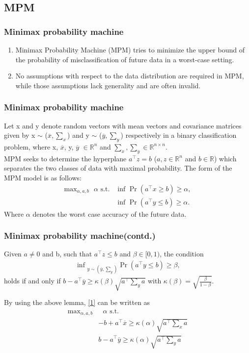 \documentclass{beamer}
\providecommand{\pr}[1]{\ensuremath{\Pr\left(#1\right)}}
\begin{document}
\subsection*{MPM}
\begin{frame}[fragile]
\frametitle{Minimax probability machine}
\begin{enumerate}
    \item Minimax Probability Machine (MPM) tries to minimize the upper bound of the probability of misclassification of future data in a worst-case setting.
    \item No assumptions with respect to the data distribution
    are required in MPM, while those assumptions lack generality
    and are often invalid.
\end{enumerate}
\end{frame}
\begin{frame}[fragile]
\frametitle{Minimax probability machine}
Let x and y denote random vectors with mean vectors and covariance matrices given by x $\sim$ ($\overline{x},\sum_x$) and  y $\sim$ ($\overline{y},\sum_y$) respectively in a binary classification problem, where x, $\overline{x}$, y, $\overline{y}$ $\in \mathbb{R}^n$ and $\sum_x, \sum_y \in \mathbb{R}^{n\times n} $.\\

MPM seeks to determine the hyperplane $a^{\top}z = b$ ($a,z \in \mathbb{R}^n$ and $b \in \mathbb{R}$) which separates the two classes of data with maximal probability. The form of the MPM model is as follows:\\
\begin{align}
    \text{max}_{\alpha,a,b} \text{ $\alpha$} \text{ s.t.}&\text{ inf } \pr{a^{\top} x \geq b } \geq \alpha,  \label{1}\\
    &\text{ inf } \pr{a^{\top}y \leq b } \geq \alpha. \nonumber
\end{align}
Where $\alpha$ denotes the worst case accuracy of the future data.

\end{frame}
\begin{frame}[fragile]
\frametitle{Minimax probability machine(contd.)}
    \begin{lemma}
    Given $a\neq 0$ and b, such that $a^{\top}z \leq b $ and $\beta \in [0,1)$, the condition 
    \begin{align}
        \text{ inf }_{y \sim (\overline{y},\sum_y)} \pr{a^{\top}y \leq b } \geq \beta, \nonumber
    \end{align}
    holds if and only if $b-a^{\top} \overline{y} \geq \kappa(\beta)\sqrt{a^{\top}\sum_y a}$ with $\kappa(\beta)=\sqrt{\frac{\beta}{1-\beta}}$.
    \end{lemma}
    By using the above lemma, \eqref{1} can be written as 
    \begin{align}
        \text{max}_{\alpha,a,b} &\text{ $\alpha$} \text{ s.t.}\nonumber\\
        & -b+a^{\top}\overline{x} \geq \kappa(\alpha)\sqrt{a^{\top}\textstyle \sum_x a}\label{eq2}\\
        & b-a^{\top} \overline{y} \geq \kappa(\alpha)\sqrt{a^{\top}\textstyle \sum_y a}\label{eq3}
    \end{align}
    \end{frame}
\end{document}
